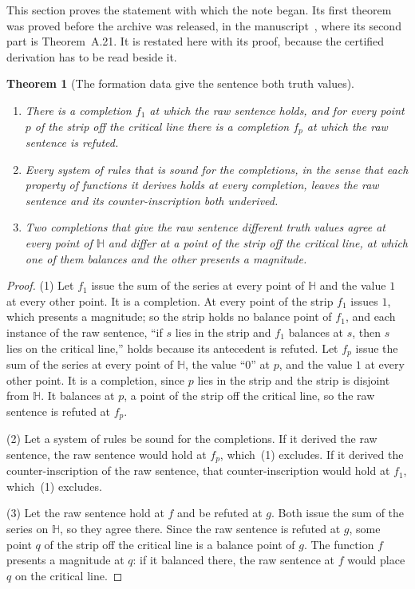 \documentclass[11pt]{article}
\newtheorem{theorem}{Theorem}[section]
\theoremstyle{definition}
\theoremstyle{remark}
\newcommand{\Hp}{\mathbb H}
\begin{document}
This section proves the statement with which the note began. Its first theorem was proved before the archive was released, in the manuscript~\citep{tv}, where its second part is Theorem~A.21. It is restated here with its proof, because the certified derivation has to be read beside it.

\begin{theorem}[The formation data give the sentence both truth values]\label{thm:both}
\leavevmode
\begin{enumerate}[leftmargin=2em,itemsep=1pt]
\item There is a completion $f_1$ at which the raw sentence holds, and for every point $p$ of the strip off the critical line there is a completion $f_p$ at which the raw sentence is refuted.
\item Every system of rules that is sound for the completions, in the sense that each property of functions it derives holds at every completion, leaves the raw sentence and its counter-inscription both underived.
\item Two completions that give the raw sentence different truth values agree at every point of $\Hp$ and differ at a point of the strip off the critical line, at which one of them balances and the other presents a magnitude.
\end{enumerate}
\end{theorem}

\begin{proof}
(1) Let $f_1$ issue the sum of the series at every point of $\Hp$ and the value $1$ at every other point. It is a completion. At every point of the strip $f_1$ issues $1$, which presents a magnitude; so the strip holds no balance point of $f_1$, and each instance of the raw sentence, ``if $s$ lies in the strip and $f_1$ balances at $s$, then $s$ lies on the critical line,'' holds because its antecedent is refuted. Let $f_p$ issue the sum of the series at every point of $\Hp$, the value ``0'' at $p$, and the value $1$ at every other point. It is a completion, since $p$ lies in the strip and the strip is disjoint from $\Hp$. It balances at $p$, a point of the strip off the critical line, so the raw sentence is refuted at $f_p$.

(2) Let a system of rules be sound for the completions. If it derived the raw sentence, the raw sentence would hold at $f_p$, which~(1) excludes. If it derived the counter-inscription of the raw sentence, that counter-inscription would hold at $f_1$, which~(1) excludes.

(3) Let the raw sentence hold at $f$ and be refuted at $g$. Both issue the sum of the series on $\Hp$, so they agree there. Since the raw sentence is refuted at $g$, some point $q$ of the strip off the critical line is a balance point of $g$. The function $f$ presents a magnitude at $q$: if it balanced there, the raw sentence at $f$ would place $q$ on the critical line.
\end{proof}
\end{document}
